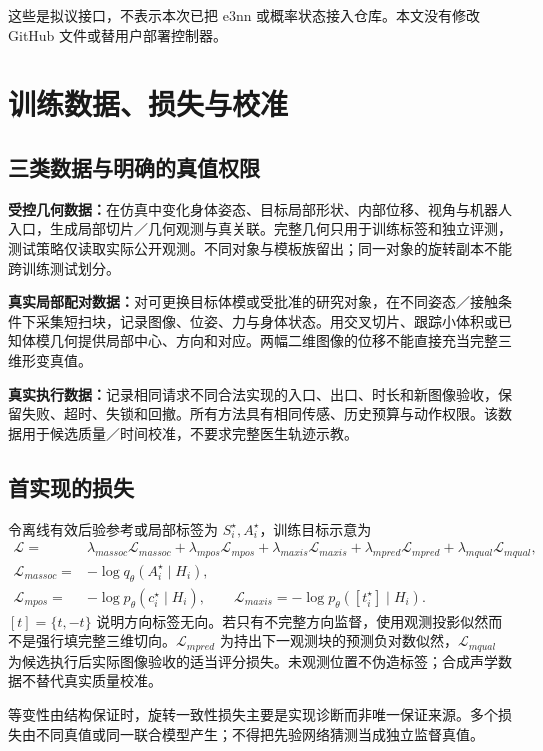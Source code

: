 \documentclass[UTF8,fontset=fandol,11pt,a4paper]{ctexart}
\theoremstyle{plain}
\theoremstyle{definition}
\theoremstyle{remark}
\numberwithin{equation}{section}
\begin{document}
这些是拟议接口，不表示本次已把 e3nn 或概率状态接入仓库。本文没有修改 GitHub 文件或替用户部署控制器。

\section{训练数据、损失与校准}
\label{sec:training}
\subsection{三类数据与明确的真值权限}
\textbf{受控几何数据：}在仿真中变化身体姿态、目标局部形状、内部位移、视角与机器人入口，生成局部切片／几何观测与真关联。完整几何只用于训练标签和独立评测，测试策略仅读取实际公开观测。不同对象与模板族留出；同一对象的旋转副本不能跨训练测试划分。

\textbf{真实局部配对数据：}对可更换目标体模或受批准的研究对象，在不同姿态／接触条件下采集短扫块，记录图像、位姿、力与身体状态。用交叉切片、跟踪小体积或已知体模几何提供局部中心、方向和对应。两幅二维图像的位移不能直接充当完整三维形变真值。

\textbf{真实执行数据：}记录相同请求不同合法实现的入口、出口、时长和新图像验收，保留失败、超时、失锁和回撤。所有方法具有相同传感、历史预算与动作权限。该数据用于候选质量／时间校准，不要求完整医生轨迹示教。

\subsection{首实现的损失}
令离线有效后验参考或局部标签为 $S_i^\star,A_i^\star$，训练目标示意为
\begin{align}
 \mathcal L=&\lambda_{
m assoc}\mathcal L_{
m assoc}
 +\lambda_{
m pos}\mathcal L_{
m pos}
 +\lambda_{
m axis}\mathcal L_{
m axis}
 +\lambda_{
m pred}\mathcal L_{
m pred}
 +\lambda_{
m qual}\mathcal L_{
m qual},\\
 \mathcal L_{
m assoc}=&-\log q_\theta(A_i^\star\mid H_i),\\
 \mathcal L_{
m pos}=&-\log p_\theta(c_i^\star\mid H_i),\qquad
 \mathcal L_{
m axis}=-\log p_\theta([t_i^\star]\mid H_i).
 \label{eq:loss}
\end{align}
$[t]=\{t,-t\}$ 说明方向标签无向。若只有不完整方向监督，使用观测投影似然而不是强行填完整三维切向。$\mathcal L_{
m pred}$ 为持出下一观测块的预测负对数似然，$\mathcal L_{
m qual}$ 为候选执行后实际图像验收的适当评分损失。未观测位置不伪造标签；合成声学数据不替代真实质量校准。

等变性由结构保证时，旋转一致性损失主要是实现诊断而非唯一保证来源。多个损失由不同真值或同一联合模型产生；不得把先验网络猜测当成独立监督真值。
\end{document}
